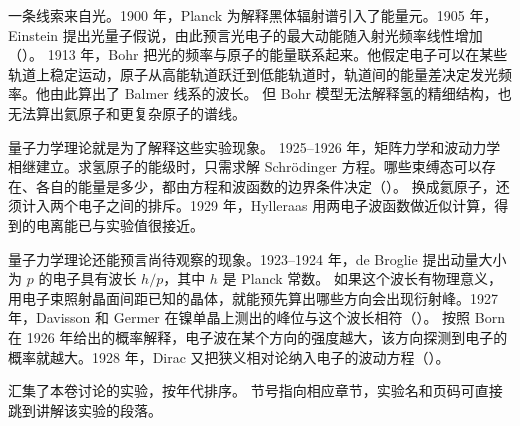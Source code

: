 一条线索来自光。1900 年，Planck 为解释黑体辐射谱引入了能量元。1905 年，Einstein 提出光量子假说，由此预言光电子的最大动能随入射光频率线性增加（）。
1913 年，Bohr 把光的频率与原子的能量联系起来。他假定电子可以在某些轨道上稳定运动，原子从高能轨道跃迁到低能轨道时，轨道间的能量差决定发光频率。他由此算出了 Balmer 线系的波长\cite{bohrlecture}。
但 Bohr 模型无法解释氢的精细结构，也无法算出氦原子和更复杂原子的谱线\cite{helium-models}。

量子力学理论就是为了解释这些实验现象。
1925--1926 年，矩阵力学和波动力学相继建立。求氢原子的能级时，只需求解 Schrödinger 方程。哪些束缚态可以存在、各自的能量是多少，都由方程和波函数的边界条件决定（）。
换成氦原子，还须计入两个电子之间的排斥。1929 年，Hylleraas 用两电子波函数做近似计算，得到的电离能已与实验值很接近\cite{helium-models}。

量子力学理论还能预言尚待观察的现象。1923--1924 年，de Broglie 提出动量大小为 $p$ 的电子具有波长 $h/p$，其中 $h$ 是 Planck 常数\cite{debroglie}。
如果这个波长有物理意义，用电子束照射晶面间距已知的晶体，就能预先算出哪些方向会出现衍射峰。1927 年，Davisson 和 Germer 在镍单晶上测出的峰位与这个波长相符（）\cite{davisson}。
按照 Born 在 1926 年给出的概率解释，电子波在某个方向的强度越大，该方向探测到电子的概率就越大。1928 年，Dirac 又把狭义相对论纳入电子的波动方程（）。

汇集了本卷讨论的实验，按年代排序。
节号指向相应章节，实验名和页码可直接跳到讲解该实验的段落。


